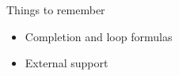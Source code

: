 \begin{frame}{Things to remember}
  \medskip
  \begin{itemize}
  \item Completion and loop formulas
  \item External support
  \end{itemize}
\end{frame}
%
